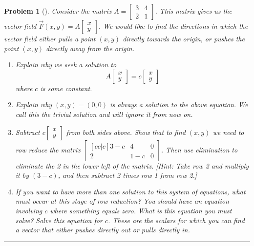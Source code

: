 \documentclass[letterpaper,oneside]{book}%
\theoremstyle{plain}
\theoremstyle{box}
\theoremstyle{problem}
\newtheorem{problemnum}{Problem}[chapter]
\newenvironment{problem}[1][]{\begin{problemnum}[#1]}{\end{problemnum}\nopagebreak\hrule\bigskip}
\newcommand{\bvec}[1]{\begin{bmatrix} #1 \end{bmatrix}}
\begin{document}
\begin{problem}
Consider the matrix 
$A=\bvec{3&4\\2&1}$.  This matrix gives us the vector field $\vec F(x,y) = A\bvec{x\\y}$. We would like to find the directions in which the vector field either pulls a point $(x,y)$ directly towards the origin, or pushes the point $(x,y)$ directly away from the origin.
\begin{enumerate}
 \item Explain why we seek a solution to $$ A\bvec{x\\y} = c\bvec{x\\y}$$ where $c$ is some constant. 
 \item Explain why $(x,y)=(0,0)$ is always a solution to the above equation.  We call this the trivial solution and will ignore it from now on.
 \item Subtract $c\bvec{x\\y}$ from both sides above.  Show that to find $(x,y)$ we need to row reduce the matrix $\bvec{[cc|c]3-c&4&0\\2&1-c&0}$. Then use elimination to eliminate the 2 in the lower left of the matrix. [Hint: Take row 2 and multiply it by $(3-c)$, and then subtract 2 times row 1 from row 2.]
 \item If you want to have more than one solution to this system of equations, what must occur at this stage of row reduction?  You should have an equation involving $c$ where something equals zero.  What is this equation you must solve? Solve this equation for $c$.  These are the scalars for which you can find a vector that either pushes directly out or pulls directly in.
\end{enumerate}

\end{problem}
\end{document}
